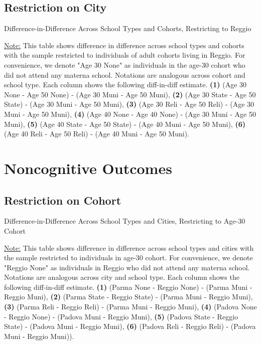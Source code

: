 \documentclass[11pt]{article}
\begin{document}
\subsection{Restriction on City}
\begin{table}[H]
\begin{center}
	\caption{Difference-in-Difference Across School Types and Cohorts, Restricting to Reggio}
	\scalebox{0.80}{
		}
\end{center}
\footnotesize
\underline{Note:} This table shows difference in difference across school types and cohorts with the sample restricted to individuals of adult cohorts living in Reggio. For convenience, we denote "Age 30 None" as individuals in the age-30 cohort who did not attend any materna school. Notations are analogous across cohort and school type. Each column shows the following diff-in-diff estimate. \textbf{(1)} (Age 30 None - Age 50 None) - (Age 30 Muni - Age 50 Muni), \textbf{(2)} (Age 30 State - Age 50 State) - (Age 30 Muni - Age 50 Muni), \textbf{(3)} (Age 30 Reli - Age 50 Reli) - (Age 30 Muni - Age 50 Muni), \textbf{(4)} (Age 40 None - Age 40 None) - (Age 30 Muni - Age 50 Muni),  \textbf{(5)} (Age 40 State - Age 50 State) - (Age 40 Muni - Age 50 Muni), \textbf{(6)} (Age 40 Reli - Age 50 Reli) - (Age 40 Muni - Age 50 Muni). 
\end{table}






\section{Noncognitive Outcomes}
\subsection{Restriction on Cohort}
\begin{table}[H]
\begin{center}
	\caption{Difference-in-Difference Across School Types and Cities, Restricting to Age-30 Cohort}
	\scalebox{0.80}{
		}
\end{center}
\footnotesize
\underline{Note:} This table shows difference in difference across school types and cities with the sample restricted to individuals in age-30 cohort. For convenience, we denote "Reggio None" as individuals in Reggio who did not attend any materna school. Notations are analogous across city and school type. Each column shows the following diff-in-diff estimate. \textbf{(1)} (Parma None - Reggio None) - (Parma Muni - Reggio Muni), \textbf{(2)} (Parma State - Reggio State) - (Parma Muni - Reggio Muni), \textbf{(3)} (Parma Reli - Reggio Reli) - (Parma Muni - Reggio Muni), \textbf{(4)} (Padova None - Reggio None) - (Padova Muni - Reggio Muni),  \textbf{(5)} (Padova State - Reggio State) - (Padova Muni - Reggio Muni), \textbf{(6)} (Padova Reli - Reggio Reli) - (Padova Muni - Reggio Muni)). 
\end{table}
\end{document}
